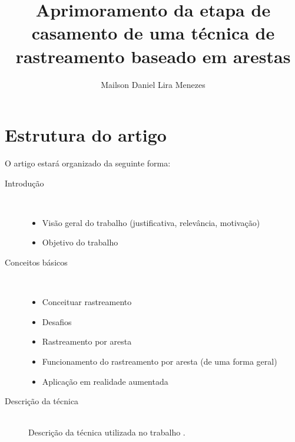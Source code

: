 \documentclass[12pt]{article}
\title{Aprimoramento da etapa de casamento de uma técnica de rastreamento baseado em arestas}
\author{Mailson Daniel Lira Menezes\inst{1}}
\begin{document}
\maketitle

\section{Estrutura do artigo}

O artigo estará organizado da seguinte forma:

\begin{description}
    \item[Introdução] \hfill \\
    \begin{itemize}
        \item Visão geral do trabalho (justificativa, relevância, motivação)
        \item Objetivo do trabalho \\
    \end{itemize}

    \item[Conceitos básicos] \hfill \\
    \begin{itemize}
        \item Conceituar rastreamento \cite{lepetit}
        \item Desafios
        \item Rastreamento por aresta
        \item Funcionamento do rastreamento por aresta (de uma forma geral)
        \item Aplicação em realidade aumentada \\
    \end{itemize}

    \item[Descrição da técnica] \hfill \\
    Descrição da técnica utilizada no trabalho \cite{celine}.
\end{description}

\nocite{*}


\end{document}
